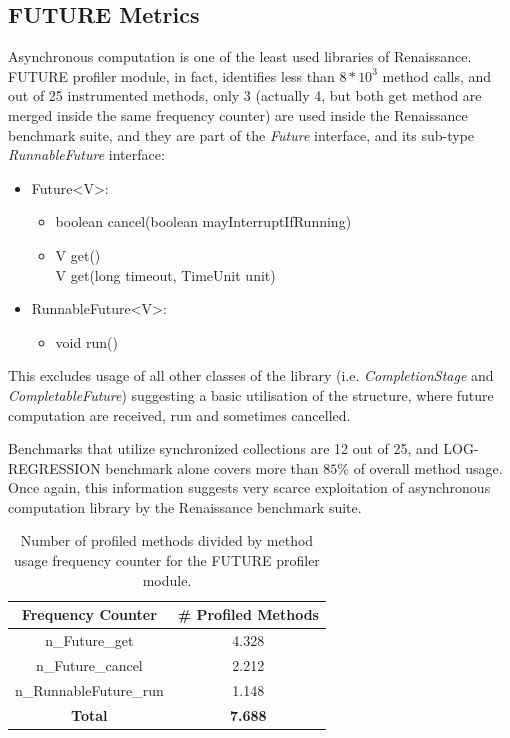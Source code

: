 \documentclass[]{usiinfthesis}
\begin{document}
 \subsection{FUTURE Metrics}
Asynchronous computation is one of the least used libraries of Renaissance. FUTURE profiler module, in fact, identifies less than \(8*10^3\) method calls, and out of 25 instrumented methods, only 3 (actually 4, but both get method are merged inside the same frequency counter) are used inside the Renaissance benchmark suite, and they are part of the \textit{Future} interface, and its sub-type \textit{RunnableFuture} interface:
\begin{itemize}
    \item Future<V>:
    \begin{itemize}
        \item   boolean cancel(boolean mayInterruptIfRunning)
        \item   V get()
        \mbox{}\\ V get(long timeout, TimeUnit unit)
    \end{itemize}
    \item RunnableFuture<V>:
    \begin{itemize}
        \item   void run()
    \end{itemize}
\end{itemize}
 This excludes usage of all other classes of the library (i.e. \textit{CompletionStage} and \textit{CompletableFuture}) suggesting a basic utilisation of the structure, where future computation are received, run and sometimes cancelled.
 
 Benchmarks that utilize synchronized collections are 12 out of 25, and LOG-REGRESSION benchmark alone covers more than \(85\%\) of overall method usage. Once again, this information suggests very scarce exploitation of asynchronous computation library by the Renaissance benchmark suite.


\begin{table}
\centering
\caption{Number of profiled methods divided by method usage frequency counter for the FUTURE profiler module.}
\begin{tabular}{|c|c|}
\hline
\textbf{Frequency Counter} & \textbf{# Profiled Methods} \\
\hline
n\_Future\_get	&	 4.328 	 \\ 
n\_Future\_cancel	&	 2.212 	 \\ 
n\_RunnableFuture\_run	&	 1.148 	 \\ 
\hline			
\hline			
\textbf{Total}	&  \textbf{	 7.688 	 }\\ 
\hline		
\end{tabular}
\end{table}%
\end{document}
